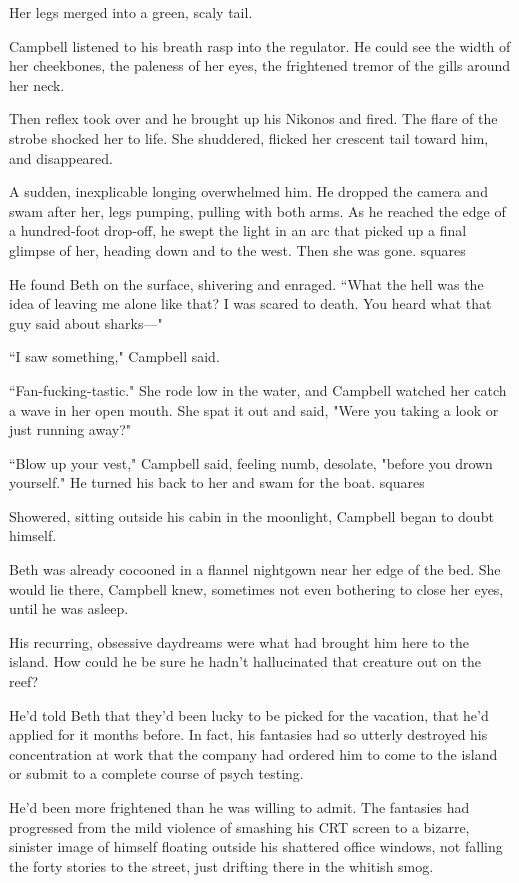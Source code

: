 Her legs merged into a green, scaly tail.

Campbell listened to his breath rasp into the regulator. He could see the width of her cheekbones, the paleness of her eyes, the frightened tremor of the gills around her neck.

Then reflex took over and he brought up his Nikonos and fired. The flare of the strobe shocked her to life. She shuddered, flicked her crescent tail toward him, and disappeared.

A sudden, inexplicable longing overwhelmed him. He dropped the camera and swam after her, legs pumping, pulling with both arms. As he reached the edge of a hundred-foot drop-off, he swept the light in an arc that picked up a final glimpse of her, heading down and to the west. Then she was gone.
squares

He found Beth on the surface, shivering and enraged. ``What the hell was the idea of leaving me alone like that? I was scared to death. You heard what that guy said about sharks---"

``I saw something," Campbell said.

``Fan-fucking-tastic." She rode low in the water, and Campbell watched her catch a wave in her open mouth. She spat it out and said, "Were you taking a look or just running away?"

``Blow up your vest," Campbell said, feeling numb, desolate, "before you drown yourself." He turned his back to her and swam for the boat.
squares

Showered, sitting outside his cabin in the moonlight, Campbell began to doubt himself.

Beth was already cocooned in a flannel nightgown near her edge of the bed. She would lie there, Campbell knew, sometimes not even bothering to close her eyes, until he was asleep.

His recurring, obsessive daydreams were what had brought him here to the island. How could he be sure he hadn't hallucinated that creature out on the reef?

He'd told Beth that they'd been lucky to be picked for the vacation, that he'd applied for it months before. In fact, his fantasies had so utterly destroyed his concentration at work that the company had ordered him to come to the island or submit to a complete course of psych testing.

He'd been more frightened than he was willing to admit. The fantasies had progressed from the mild violence of smashing his CRT screen to a bizarre, sinister image of himself floating outside his shattered office windows, not falling the forty stories to the street, just drifting there in the whitish smog.

